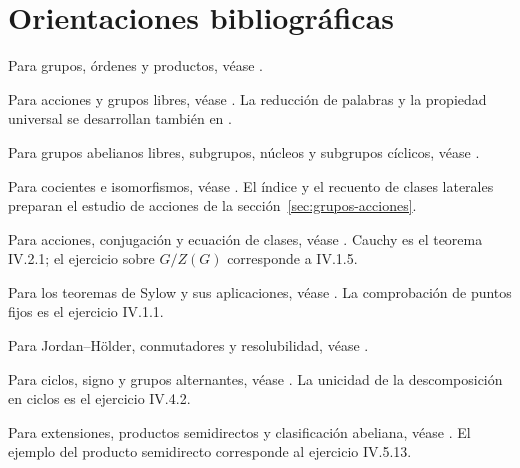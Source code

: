 \section*{Orientaciones bibliográficas}
Para grupos, órdenes y productos, véase \citet[cap.~II, definición 1.2, resultados 1.9--10 y 1.12--14]{aluffi2009}.

Para acciones y grupos libres, véase \citet[cap.~II, 4.1/3/5--8 y 5.1/3]{aluffi2009}. La reducción de palabras y la propiedad universal se desarrollan también en \citet[cap.~2, proposiciones 2.1--3, pp.~32--33]{milne2025}.

Para grupos abelianos libres, subgrupos, núcleos y subgrupos cíclicos, véase \citet[cap.~II, 6.1--4, 6.6, 6.9 y 6.11]{aluffi2009}.

Para cocientes e isomorfismos, véase \citet[cap.~II, 7.1--4/6--10/12 y 8.1--2]{aluffi2009}. El índice y el recuento de clases laterales preparan el estudio de acciones de la sección~\ref{sec:grupos-acciones}.

Para acciones, conjugación y ecuación de clases, véase \citet[cap.~II, 9.6--12, y cap.~IV, 1.1/3/5--7/9/11--14]{aluffi2009}. Cauchy es el teorema IV.2.1; el ejercicio sobre $G/Z(G)$ corresponde a IV.1.5.

Para los teoremas de Sylow y sus aplicaciones, véase \citet[cap.~IV, 2.2--3/5--6/8--16]{aluffi2009}. La comprobación de puntos fijos es el ejercicio IV.1.1.

Para Jordan--Hölder, conmutadores y resolubilidad, véase \citet[cap.~IV, 3.1--13]{aluffi2009}.

Para ciclos, signo y grupos alternantes, véase \citet[cap.~IV, 4.1--4/6/8--21]{aluffi2009}. La unicidad de la descomposición en ciclos es el ejercicio IV.4.2.

Para extensiones, productos semidirectos y clasificación abeliana, véase \citet[cap.~IV, 5.1--3/5--13, 6.1--6 y ejemplo 6.8]{aluffi2009}. El ejemplo del producto semidirecto corresponde al ejercicio IV.5.13.
